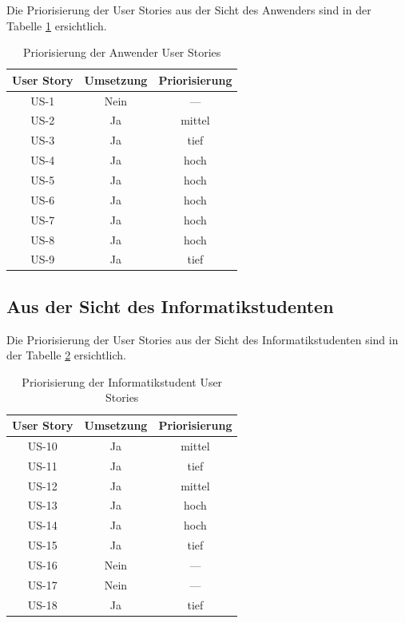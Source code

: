 \documentclass[abstracton, listof=totocnumbered,
bibliography=totocnumbered]{scrreprt}
\begin{document}
  Die Priorisierung der User Stories aus der Sicht des Anwenders sind in der
  Tabelle \ref{tab:anwenderUserStoriesPriorisierung} ersichtlich.
  \newline
  
  \begin{table}[h]
    \begin{center}  
      \begin{tabular}{ccc}
        \toprule
        User Story & Umsetzung & Priorisierung \\
        \midrule
        US-1 & Nein & --- \\
        US-2 & Ja & mittel \\
        US-3 & Ja & tief \\
        US-4 & Ja & hoch \\
        US-5 & Ja & hoch \\
        US-6 & Ja & hoch \\
        US-7 & Ja & hoch \\
        US-8 & Ja & hoch \\
        US-9 & Ja & tief \\
        \bottomrule
      \end{tabular}
      \caption{Priorisierung der Anwender User Stories}
      \label{tab:anwenderUserStoriesPriorisierung}
    \end{center}
  \end{table}
  
  \subsection{Aus der Sicht des Informatikstudenten}
  
  Die Priorisierung der User Stories aus der Sicht des Informatikstudenten sind
  in der Tabelle \ref{tab:informatikstudentUserStoriesPriorisierung}
  ersichtlich.
  \newline
  
  \enlargethispage{3cm}
  
  \begin{table}[h]
    \begin{center} 
      \begin{tabular}{ccc}
        \toprule
        User Story & Umsetzung & Priorisierung \\
        \midrule
        US-10 & Ja & mittel \\
        US-11 & Ja & tief \\
        US-12 & Ja & mittel \\
        US-13 & Ja & hoch \\
        US-14 & Ja & hoch \\
        US-15 & Ja & tief \\
        US-16 & Nein & --- \\
        US-17 & Nein & --- \\
        US-18 & Ja & tief \\
        \bottomrule
      \end{tabular}
      \caption{Priorisierung der Informatikstudent User Stories}
      \label{tab:informatikstudentUserStoriesPriorisierung}
    \end{center}  
  \end{table}
  
\end{document}
